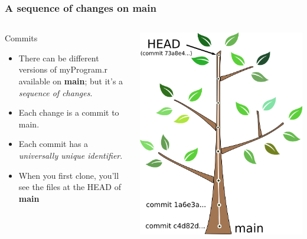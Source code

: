 \documentclass{beamer}
\begin{document}
\begin{frame}
  \frametitle{A sequence of changes on main}
  \begin{columns}[T]
    \begin{column}{.5\textwidth}
      \begin{block}{Commits}
        \begin{itemize}
          \item There can be different versions of myProgram.r available on
            \textbf{main}; but it's a \emph{sequence of changes}.

          \item Each change is a \alert{commit to main}.

          \item Each commit has a \emph{universally unique identifier}.

          \item When you first clone, you'll see the files at the \alert{HEAD}
            of \textbf{main}
        \end{itemize}
      \end{block}
    \end{column}
    \begin{column}{.5\textwidth}
      \includegraphics[width=\textwidth]{tree_mastercommits_head.png}
    \end{column}
  \end{columns}
\end{frame}
\end{document}
